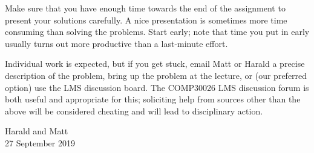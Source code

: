 \documentclass[12pt]{article}
\begin{document}
Make sure that you have enough time towards the end of the assignment
to present your solutions carefully.
A nice presentation is sometimes more time consuming than solving the
problems.
Start early; note that time you put in early usually turns out more
productive than a last-minute effort.

Individual work is expected, but if you get stuck, email Matt or Harald
a precise description of the problem, bring up the problem at the
lecture, or (our preferred option) use the LMS discussion board.
The COMP30026 LMS discussion forum is both useful and appropriate
for this;
soliciting help from sources other than the above
will be considered cheating and will lead to disciplinary action.

\begin{flushright}
Harald and Matt
\\ 27 September 2019
\end{flushright}
\end{document}
